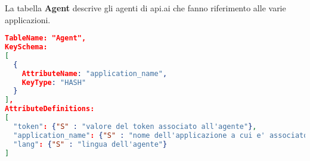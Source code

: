 La tabella \textbf{Agent} descrive gli agenti di api.ai che fanno riferimento alle varie applicazioni.
\begin{lstlisting}[language=json,firstnumber=1]
TableName: "Agent",
KeySchema:
[
  {
    AttributeName: "application_name",
    KeyType: "HASH"
  }
],
AttributeDefinitions:
[
  "token": {"S" : "valore del token associato all'agente"},
  "application_name": {"S" : "nome dell'applicazione a cui e' associato l'agente"},
  "lang": {"S" : "lingua dell'agente"}
]
\end{lstlisting}
